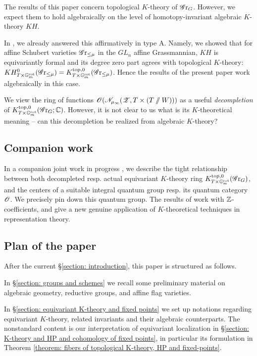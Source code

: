 \begin{remark}
The results of this paper concern topological $K$-theory of $\operatorname{\mathscr{G}r}_G$. However, we expect them to hold algebraically on the level of homotopy-invariant algebraic $K$-theory $KH$.

In \cite{Low25}, we already answered this affirmatively in type A. Namely, we showed that for affine Schubert varieties $\operatorname{\mathscr{G}r}_{\leq \mu}$ in the $GL_n$ affine Grassmannian, $KH$ is equivariantly formal and its degree zero part agrees with topological $K$-theory:
$KH^0_{T \times \mathbb{G}_m^{\mathrm{rot}}}(\operatorname{\mathscr{G}r}_{\leq \mu}) = K^{\mathrm{top}, 0}_{T \times \mathbb{G}_m^{\mathrm{rot}}}(\operatorname{\mathscr{G}r}_{\leq \mu})$.
Hence the results of the present paper work algebraically in this case.
\end{remark}

\begin{remark}\label{question: decompletion of K-theory}
We view the ring of functions $\operatorname{\mathscr{O}}({\mathscr{N}}_{\mu_{\infty}}(\operatorname{\mathscr{Z}}, T \times (T \sslash W)))$ as a useful \emph{decompletion} of $K^{\mathrm{top}, 0}_{T \times \mathbb{G}_m^{\mathrm{rot}}}(\operatorname{\mathscr{G}r}_G; \operatorname{\mathbb{C}})$.
However, it is not clear to us what is its $K$-theoretical meaning -- can this decompletion be realized from algebraic $K$-theory?
\end{remark}

\subsection{Companion work}
In a companion joint work in progress \cite{HL25}, we describe the tight relationship between both decompleted resp. actual equivariant $K$-theory ring $K^{\mathrm{top}, 0}_{T \times \mathbb{G}_m^{\mathrm{rot}}}(\operatorname{\mathscr{G}r}_G)$, and the centers of a suitable integral quantum group resp. its quantum category $\operatorname{\mathscr{O}}$. We precisely pin down this quantum group. The results of \cite{HL25} work with $\operatorname{\mathbb{Z}}$-coefficients, and give a new genuine application of $K$-theoretical techniques in representation theory.



\subsection{Plan of the paper}
After the current \S \ref{section: introduction}, this paper is structured as follows.

In \S \ref{section: groups and schemes} we recall some preliminary material on algebraic geometry, reductive groups, and affine flag varieties.

In \S \ref{section: equivariant K-theory and fixed points} we set up notations regarding equivariant $K$-theory, related invariants and their algebraic counterparts. The nonstandard content is our interpretation of equivariant localization in \S \ref{section: K-theory and HP and cohomology of fixed points}, in particular its formulation in Theorem \ref{theorem: fibers of topological K-theory, HP and fixed-points}.


